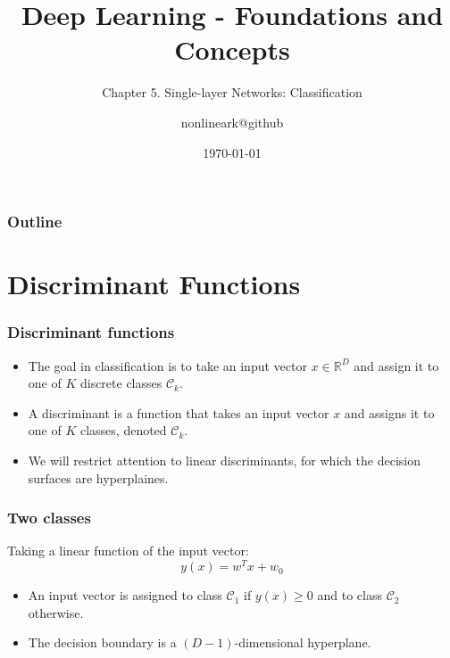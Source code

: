 \documentclass{beamer}
\title{Deep Learning - Foundations and Concepts}
\subtitle{Chapter 5. Single-layer Networks: Classification}
\author{nonlineark@github}
\date{\today}
\begin{document}
\begin{frame}
    \titlepage
\end{frame}

\begin{frame}
    \frametitle{Outline}
    \tableofcontents
\end{frame}

\section{Discriminant Functions}

\begin{frame}
    \frametitle{Discriminant functions}
    \begin{itemize}
        \item The goal in classification is to take an input vector $x\in\mathbb{R}^{D}$ and assign it to one of $K$ discrete classes $\mathcal{C}_{k}$.
        \item A discriminant is a function that takes an input vector $x$ and assigns it to one of $K$ classes, denoted $\mathcal{C}_{k}$.
        \item We will restrict attention to linear discriminants, for which the decision surfaces are hyperplaines.
    \end{itemize}
\end{frame}

\begin{frame}
    \frametitle{Two classes}
    Taking a linear function of the input vector:
    \begin{equation*}
        y(x)=w^{T}x+w_{0}
    \end{equation*}
    \begin{itemize}
        \item An input vector is assigned to class $\mathcal{C}_{1}$ if $y(x)\ge{}0$ and to class $\mathcal{C}_{2}$ otherwise.
        \item The decision boundary is a $(D-1)$-dimensional hyperplane.
    \end{itemize}
\end{frame}
\end{document}
